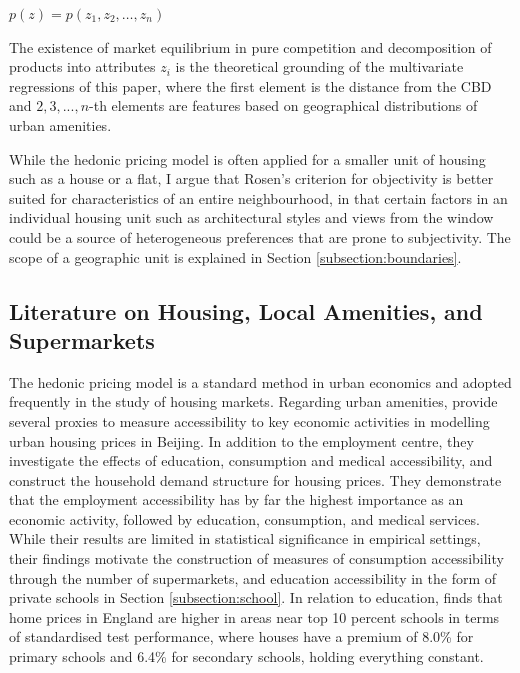 \documentclass{article}
\begin{document}
\begin{center}
    $p ( z ) = p \left( z _ { 1 } , z _ { 2 } , \dots , z _ { n } \right)$
\end{center}

The existence of market equilibrium in pure competition and decomposition of products into attributes $z_i$ is the theoretical grounding of the multivariate regressions of this paper, where the first element is the distance from the CBD and $2, 3, ..., n$-th elements are features based on geographical distributions of urban amenities.

While the hedonic pricing model is often applied for a smaller unit of housing such as a house or a flat, I argue that Rosen's criterion for objectivity is better suited for characteristics of an entire neighbourhood, in that certain factors in an individual housing unit such as architectural styles and views from the window could be a source of heterogeneous preferences that are prone to subjectivity. The scope of a geographic unit is explained in Section \ref{subsection:boundaries}.

\subsection{Literature on Housing, Local Amenities, and Supermarkets} \label{subsection:lit:supermarkets}
The hedonic pricing model is a standard method in urban economics and adopted frequently in the study of housing markets. Regarding urban amenities, \citet{Niu2016ModelingDemand} provide several proxies to measure accessibility to key economic activities in modelling urban housing prices in Beijing. In addition to the employment centre, they investigate the effects of education, consumption and medical accessibility, and construct the household demand structure for housing prices. They demonstrate that the employment accessibility has by far the highest importance as an economic activity, followed by education, consumption, and medical services. While their results are limited in statistical significance in empirical settings, their findings motivate the construction of measures of consumption accessibility through the number of supermarkets, and education accessibility in the form of private schools in Section \ref{subsection:school}. In relation to education, \citet{DepartmentforEducation2017HouseMore} finds that home prices in England are higher in areas near top 10 percent schools in terms of standardised test performance, where houses have a premium of 8.0\% for primary schools and 6.4\% for secondary schools, holding everything constant.
\end{document}
